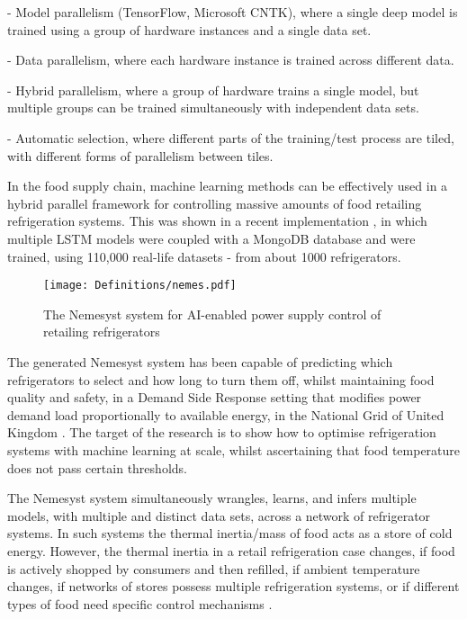 \documentclass[journal,article,accept,moreauthors,pdftex]{Definitions/mdpi}
\begin{document}
- Model parallelism  (TensorFlow, Microsoft CNTK), where a single deep model is trained using a group of hardware instances and a single data set.

- Data parallelism, where each hardware instance is trained across different data. 

- Hybrid parallelism, where a group of hardware trains a single model, but multiple groups can be trained simultaneously with independent data sets. 

- Automatic selection, where different parts of the training/test process are tiled, with different forms of parallelism between tiles.


In the food supply chain, machine learning methods can be effectively used in a hybrid parallel framework for controlling massive amounts of food retailing refrigeration systems. This was shown in a recent implementation \cite{ref33}, in which multiple LSTM models were coupled with a MongoDB database \cite{ref92} and were trained, using 110,000 real-life datasets - from about 1000 refrigerators.
 
 \begin{figure*}[tph!]
\texttt{[image: Definitions/nemes.pdf]}
\centering
\caption{The Nemesyst system for AI-enabled power supply control of retailing refrigerators}
\label{nemes}
\end{figure*}
 
 The generated Nemesyst system \cite{ref99} has been capable of predicting which refrigerators to select and how long to turn them off, whilst maintaining food quality and safety, in a Demand Side Response setting that modifies power demand load proportionally to available energy, in the National Grid of United Kingdom \cite{ref83, ref85}. The target of the research is to show how to optimise refrigeration systems with machine learning at scale, whilst ascertaining that food temperature does not pass certain  thresholds. 

The Nemesyst system simultaneously wrangles, learns, and infers multiple models, with multiple and distinct data sets, across a network of refrigerator systems. 
In such systems the thermal inertia/mass of food acts as a store of cold energy. However, the thermal inertia in a retail refrigeration case changes, if food is actively shopped by consumers and then refilled, if ambient temperature changes, if networks of stores possess multiple refrigeration systems, or if different types of food need specific control mechanisms \cite{ref94, ref95}. 
\end{document}

